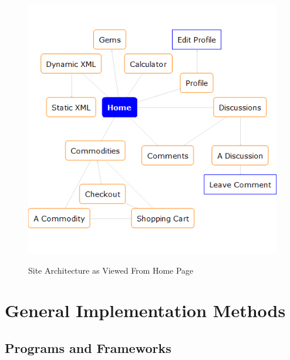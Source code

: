 \documentclass[11pt]{article}
\begin{document}
\begin{figure}[h!]
\centering
\includegraphics[scale=0.6]{./images/sitemap.png}
\label{label:sitemap}
\hypertarget{label:figsitemap}{\caption{Site Architecture as Viewed From Home Page}}
\end{figure}





\hypertarget{label:sectmeGENIMP}{ \section{General Implementation Methods}\label{label:megenimp}}




\subsection{Programs and Frameworks}
\end{document}
